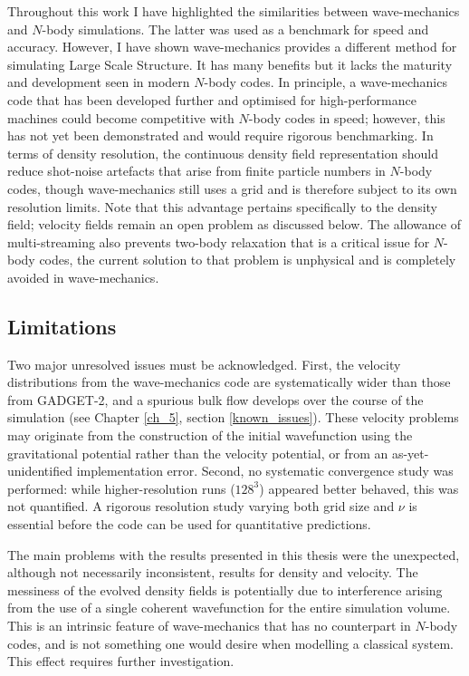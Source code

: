 Throughout this work I have highlighted the similarities between wave-mechanics and $N$-body simulations. The latter was used as a benchmark for speed and accuracy. However, I have shown wave-mechanics provides a different method for simulating Large Scale Structure. It has many benefits but it lacks the maturity and development seen in modern $N$-body codes. In principle, a wave-mechanics code that has been developed further and optimised for high-performance machines could become competitive with $N$-body codes in speed; however, this has not yet been demonstrated and would require rigorous benchmarking. In terms of density resolution, the continuous density field representation should reduce shot-noise artefacts that arise from finite particle numbers in $N$-body codes, though wave-mechanics still uses a grid and is therefore subject to its own resolution limits. Note that this advantage pertains specifically to the density field; velocity fields remain an open problem as discussed below. The allowance of multi-streaming also prevents two-body relaxation that is a critical issue for $N$-body codes, the current solution to that problem is unphysical and is completely avoided in wave-mechanics.

\subsection*{Limitations}
Two major unresolved issues must be acknowledged. First, the velocity distributions from the wave-mechanics code are systematically wider than those from GADGET-2, and a spurious bulk flow develops over the course of the simulation (see Chapter \ref{ch_5}, section \ref{known_issues}). These velocity problems may originate from the construction of the initial wavefunction using the gravitational potential rather than the velocity potential, or from an as-yet-unidentified implementation error. Second, no systematic convergence study was performed: while higher-resolution runs ($128^3$) appeared better behaved, this was not quantified. A rigorous resolution study varying both grid size and $\nu$ is essential before the code can be used for quantitative predictions.

The main problems with the results presented in this thesis were the unexpected, although not necessarily inconsistent, results for density and velocity. The messiness of the evolved density fields is potentially due to interference arising from the use of a single coherent wavefunction for the entire simulation volume. This is an intrinsic feature of wave-mechanics that has no counterpart in $N$-body codes, and is not something one would desire when modelling a classical system. This effect requires further investigation.

